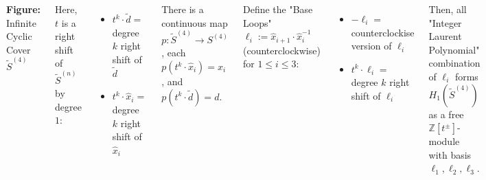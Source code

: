 \documentclass[22 pt,margin=0.9in,innermargin=-4.5in,blockverticalspace=-0.25in]{tikzposter}
\begin{document}
\begin{columns}
{\begin{center}

            \textbf{Figure:} Infinite Cyclic Cover $\tilde{S}^{(4)}$
        \end{center}
        Here, $t$ is a right shift of $\tilde{S}^{(n)}$ by degree $1$:
        \begin{itemize}
            \item $t^k\cdot \tilde{d} = $ degree $k$ right shift of $\tilde{d}$
            \item $t^k\cdot \hat{x}_i = $ degree $k$ right shift of $\hat{x}_i$
        \end{itemize}
        There is a continuous map $p:\tilde{S}^{(4)}\rightarrow S^{(4)}$, each $p(t^k \cdot \hat{x}_{i}) = x_i$, and $p(t^k \cdot \tilde{d}) = d$.
        
        Define the "Base Loops" $\ell_i := \hat{x}_{i+1}\cdot \hat{x}_i^{-1}$ (counterclockwise) for $1\leq i\leq 3$:
        \begin{itemize}
            \item $-\ell_i = $ counterclockise version of $\ell_i$
            \item $t^k \cdot \ell_i = $ degree $k$ right shift of $\ell_i$
        \end{itemize}
        Then, all "Integer Laurent Polynomial" combination of $\ell_i$ forms $H_1(\tilde{S}^{(4)})$ as a free $\mathbb{Z}[t^\pm]$-module with basis $\ell_1,\ell_2,\ell_3$.
    }
    



\end{columns}
\end{document}
